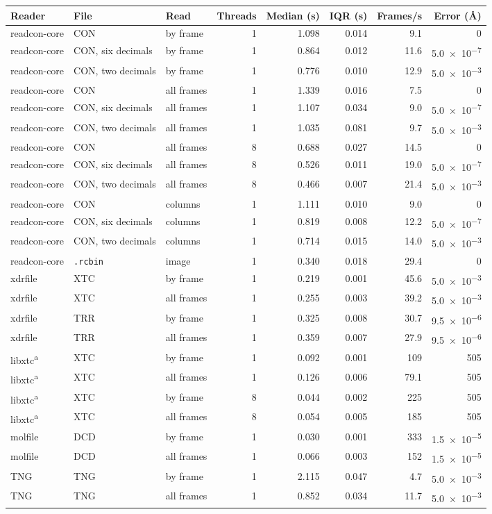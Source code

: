 \begin{tabular}{@{}lllrrrrr@{}}
\toprule
Reader & File & Read & Threads & Median (s) & IQR (s) & Frames/s & Error (\AA)\\
\midrule
readcon-core & CON & by frame & 1 & 1.098 & 0.014 & 9.1 & \num{0}\\
readcon-core & CON, six decimals & by frame & 1 & 0.864 & 0.012 & 11.6 & \num{5.0e-7}\\
readcon-core & CON, two decimals & by frame & 1 & 0.776 & 0.010 & 12.9 & \num{5.0e-3}\\
readcon-core & CON & all frames & 1 & 1.339 & 0.016 & 7.5 & \num{0}\\
readcon-core & CON, six decimals & all frames & 1 & 1.107 & 0.034 & 9.0 & \num{5.0e-7}\\
readcon-core & CON, two decimals & all frames & 1 & 1.035 & 0.081 & 9.7 & \num{5.0e-3}\\
readcon-core & CON & all frames & 8 & 0.688 & 0.027 & 14.5 & \num{0}\\
readcon-core & CON, six decimals & all frames & 8 & 0.526 & 0.011 & 19.0 & \num{5.0e-7}\\
readcon-core & CON, two decimals & all frames & 8 & 0.466 & 0.007 & 21.4 & \num{5.0e-3}\\
readcon-core & CON & columns & 1 & 1.111 & 0.010 & 9.0 & \num{0}\\
readcon-core & CON, six decimals & columns & 1 & 0.819 & 0.008 & 12.2 & \num{5.0e-7}\\
readcon-core & CON, two decimals & columns & 1 & 0.714 & 0.015 & 14.0 & \num{5.0e-3}\\
readcon-core & \texttt{.rcbin} & image & 1 & 0.340 & 0.018 & 29.4 & \num{0}\\
\addlinespace
xdrfile & XTC & by frame & 1 & 0.219 & 0.001 & 45.6 & \num{5.0e-3}\\
xdrfile & XTC & all frames & 1 & 0.255 & 0.003 & 39.2 & \num{5.0e-3}\\
xdrfile & TRR & by frame & 1 & 0.325 & 0.008 & 30.7 & \num{9.5e-6}\\
xdrfile & TRR & all frames & 1 & 0.359 & 0.007 & 27.9 & \num{9.5e-6}\\
\addlinespace
libxtc\textsuperscript{a} & XTC & by frame & 1 & 0.092 & 0.001 & 109 & \num{505}\\
libxtc\textsuperscript{a} & XTC & all frames & 1 & 0.126 & 0.006 & 79.1 & \num{505}\\
libxtc\textsuperscript{a} & XTC & by frame & 8 & 0.044 & 0.002 & 225 & \num{505}\\
libxtc\textsuperscript{a} & XTC & all frames & 8 & 0.054 & 0.005 & 185 & \num{505}\\
\addlinespace
molfile & DCD & by frame & 1 & 0.030 & 0.001 & 333 & \num{1.5e-5}\\
molfile & DCD & all frames & 1 & 0.066 & 0.003 & 152 & \num{1.5e-5}\\
\addlinespace
TNG & TNG & by frame & 1 & 2.115 & 0.047 & 4.7 & \num{5.0e-3}\\
TNG & TNG & all frames & 1 & 0.852 & 0.034 & 11.7 & \num{5.0e-3}\\
\bottomrule
\end{tabular}

